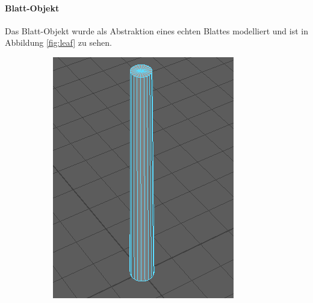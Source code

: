 \paragraph{Blatt-Objekt} Das Blatt-Objekt wurde als Abstraktion eines echten Blattes modelliert und ist in Abbildung \ref{fig:leaf} zu sehen.\\

\setlength{\fwidth}{.3\textwidth}
\begin{figure}[htb]
  \centering
  \begin{subfigure}[b]{\fwidth}
   \includegraphics[width=\textwidth]{figures/edge}
    \label{fig:edge}
  \end{subfigure}
  \hspace{.5 cm}
  \begin{subfigure}[b]{\fwidth}

\end{subfigure}
\end{figure}
